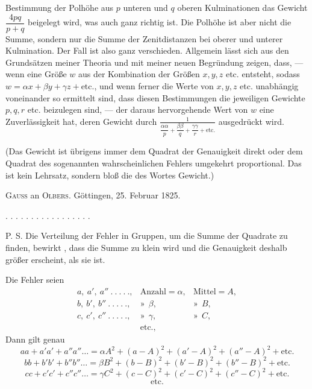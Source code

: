 Bestimmung der Polhöhe aus $p$ unteren und $q$ oberen Kulminationen das Gewicht $\dfrac{4pq}{p+q}$ beigelegt wird, was auch ganz richtig ist. Die Polhöhe ist aber nicht die Summe, sondern nur die  Summe der Zenitdistanzen bei oberer und unterer Kulmination. Der Fall ist also ganz verschieden. Allgemein lässt sich  aus den Grundsätzen meiner Theoria und  mit meiner neuen Begründung zeigen, dass, --- wenn eine Größe $w$ aus der Kombination der Größen $x,y,z$ etc. entsteht, sodass $w=\alpha x+\beta y+\gamma z+\text{etc.}$, und wenn ferner die Werte von $x,y,z$ etc. unabhängig voneinander so ermittelt sind, dass diesen Bestimmungen die jeweiligen Gewichte $p,q,r$ etc. beizulegen sind, --- der daraus hervorgehende Wert von $w$ eine Zuverlässigkeit hat, deren Gewicht durch $\frac{1}{\dfrac{\alpha\alpha}{p}+\dfrac{\beta\beta}{q}+\dfrac{\gamma\gamma}{r}+\text{etc.}} $ ausgedrückt wird.

(Das Gewicht ist übrigens immer dem Quadrat der Genauigkeit direkt oder dem Quadrat des sogenannten wahrscheinlichen Fehlers umgekehrt proportional. Das ist kein Lehrsatz, sondern bloß die  des Wortes Gewicht.)



\begin{center}
\textsc{Gauss} an \textsc{Olbers}. Göttingen, 25. Februar 1825.
\end{center}

\begin{center}
. . . . . . . . . . . . . . . . .
\end{center}

P. S. Die Verteilung der Fehler in Gruppen, um die Summe der Quadrate zu finden, bewirkt , dass die Summe zu klein wird und die Genauigkeit deshalb größer erscheint, als sie ist.

Die Fehler seien
\[
\begin{array}{lll}
a,\ a',\ a''\ .\ .\ .\ .\ ., & \text{Anzahl}=\alpha, & \text{Mittel}=A, \\
b,\ b',\ b''\ .\ .\ .\ .\ ., & \text{»}\ \ \beta, & \text{»}\ \ B, \\
c,\ c',\ c''\ .\ .\ .\ .\ ., & \text{»}\ \ \gamma, & \text{»}\ \ C, \\
& \text{etc.,} &
\end{array}
\]
Dann gilt genau
\[
aa+a'a'+a''a''\ldots=\alpha A^2+(a-A)^2+(a'-A)^2+(a''-A)^2+\text{etc.}
\]
\[
bb+b'b'+b''b''\ldots=\beta B^2+(b-B)^2+(b'-B)^2+(b''-B)^2+\text{etc.}
\]
\[
cc+c'c'+c''c''\ldots=\gamma C^2+(c-C)^2+(c'-C)^2+(c''-C)^2+\text{etc.}
\]
\[
\text{etc.}
\]

